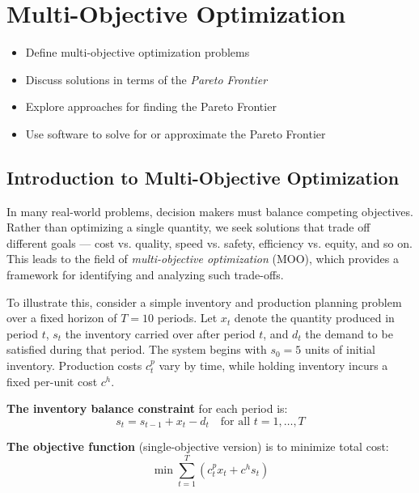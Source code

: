 \chapter{Multi-Objective Optimization}

\begin{outcome}
\begin{itemize}
    \item Define multi-objective optimization problems
    \item Discuss solutions in terms of the \emph{Pareto Frontier}
    \item Explore approaches for finding the Pareto Frontier
    \item Use software to solve for or approximate the Pareto Frontier
\end{itemize}
\end{outcome}



\section{Introduction to Multi-Objective Optimization}

In many real-world problems, decision makers must balance competing objectives. Rather than optimizing a single quantity, we seek solutions that trade off different goals — cost vs. quality, speed vs. safety, efficiency vs. equity, and so on. This leads to the field of \emph{multi-objective optimization} (MOO), which provides a framework for identifying and analyzing such trade-offs.

To illustrate this, consider a simple inventory and production planning problem over a fixed horizon of \(T = 10\) periods. Let \(x_t\) denote the quantity produced in period \(t\), \(s_t\) the inventory carried over after period \(t\), and \(d_t\) the demand to be satisfied during that period. The system begins with \(s_0 = 5\) units of initial inventory. Production costs \(c^p_t\) vary by time, while holding inventory incurs a fixed per-unit cost \(c^h\).

\textbf{The inventory balance constraint} for each period is:
\[
s_t = s_{t-1} + x_t - d_t \quad \text{for all } t = 1,\ldots,T
\]

\textbf{The objective function} (single-objective version) is to minimize total cost:
\[
\min \sum_{t=1}^{T} \left( c^p_t x_t + c^h s_t \right)
\]

